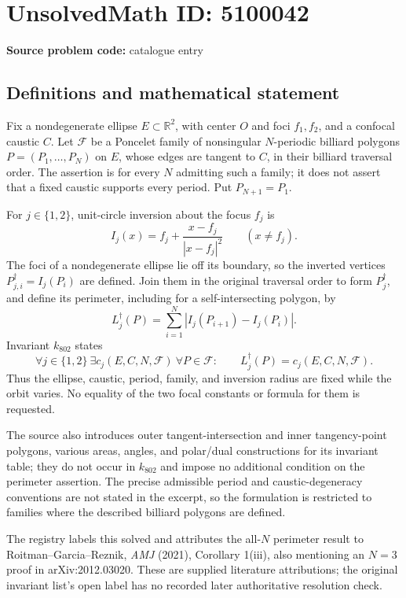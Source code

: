 \documentclass[11pt]{article}
\begin{document}
\section*{UnsolvedMath ID: 5100042}
\textbf{Source problem code:} catalogue entry
\subsection{Definitions and mathematical statement}
Fix a nondegenerate ellipse \(E\subset\mathbb R^2\), with center \(O\) and foci \(f_1,f_2\), and a confocal caustic \(C\). Let \(\mathcal F\) be a Poncelet family of nonsingular \(N\)-periodic billiard polygons \(P=(P_1,\ldots,P_N)\) on \(E\), whose edges are tangent to \(C\), in their billiard traversal order. The assertion is for every \(N\) admitting such a family; it does not assert that a fixed caustic supports every period. Put \(P_{N+1}=P_1\).

For \(j\in\{1,2\}\), unit-circle inversion about the focus \(f_j\) is
\[
 I_j(x)=f_j+\frac{x-f_j}{|x-f_j|^2}\qquad(x\ne f_j).
\]
The foci of a nondegenerate ellipse lie off its boundary, so the inverted vertices \(P_{j,i}^{\dagger}=I_j(P_i)\) are defined. Join them in the original traversal order to form \(P_j^{\dagger}\), and define its perimeter, including for a self-intersecting polygon, by
\[
 L_j^{\dagger}(P)=\sum_{i=1}^N
 \left|I_j(P_{i+1})-I_j(P_i)\right|.
\]
Invariant \(k_{802}\) states
\[
 \forall j\in\{1,2\}\ \exists c_j(E,C,N,\mathcal F)\
 \forall P\in\mathcal F:\qquad L_j^{\dagger}(P)=c_j(E,C,N,\mathcal F).
\]
Thus the ellipse, caustic, period, family, and inversion radius are fixed while the orbit varies. No equality of the two focal constants or formula for them is requested.

The source also introduces outer tangent-intersection and inner tangency-point polygons, various areas, angles, and polar/dual constructions for its invariant table; they do not occur in \(k_{802}\) and impose no additional condition on the perimeter assertion. The precise admissible period and caustic-degeneracy conventions are not stated in the excerpt, so the formulation is restricted to families where the described billiard polygons are defined.

The registry labels this solved and attributes the all-\(N\) perimeter result to Roitman--Garcia--Reznik, \emph{AMJ} (2021), Corollary 1(iii), also mentioning an \(N=3\) proof in arXiv:2012.03020. These are supplied literature attributions; the original invariant list's open label has no recorded later authoritative resolution check.
\end{document}
